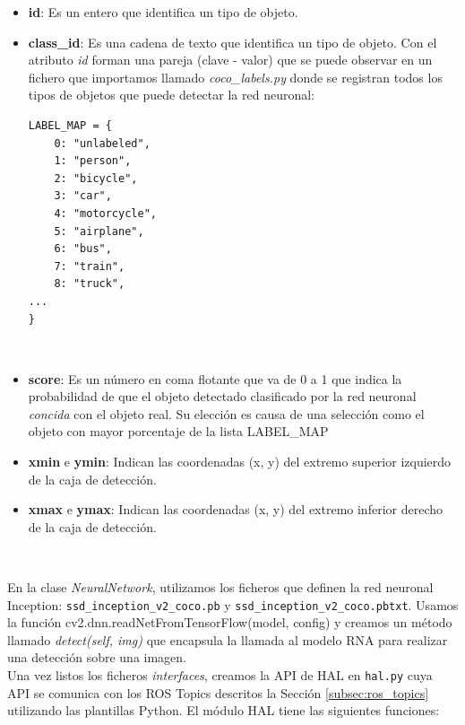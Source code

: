 \begin{itemize}
	\item \textbf{id}: Es un entero que identifica un tipo de objeto.
	\item \textbf{class\_id}: Es una cadena de texto que identifica un tipo de objeto. Con el atributo \textit{id} forman una pareja (clave - valor) que se puede observar en un fichero que importamos llamado \textit{coco\_labels.py} donde se registran todos los tipos de objetos que puede detectar la red neuronal:\\
\begin{lstlisting}
LABEL_MAP = {
    0: "unlabeled",
    1: "person",
    2: "bicycle",
    3: "car",
    4: "motorcycle",
    5: "airplane",
    6: "bus",
    7: "train",
    8: "truck",
...
}
\end{lstlisting}\
	\item \textbf{score}: Es un número en coma flotante que va de 0 a 1 que indica la probabilidad de que el objeto detectado clasificado por la red neuronal \textit{concida} con el objeto real. Su elección es causa de una selección como el objeto con mayor porcentaje de la lista LABEL\_MAP
	\item \textbf{xmin} e \textbf{ymin}: Indican las coordenadas (x, y) del extremo superior izquierdo de la caja de detección.
	\item \textbf{xmax} e \textbf{ymax}: Indican las coordenadas (x, y) del extremo inferior derecho de la caja de detección.
\end{itemize}\

En la clase \textit{NeuralNetwork}, utilizamos los ficheros que definen la red neuronal Inception: \texttt{ssd\_inception\_v2\_coco.pb} y \texttt{ssd\_inception\_v2\_coco.pbtxt}. Usamos la función cv2.dnn.readNetFromTensorFlow(model, config) y creamos un método llamado \textit{detect(self, img)} que encapsula la llamada al modelo RNA para realizar una detección sobre una imagen.\\

Una vez listos los ficheros \textit{interfaces}, creamos la API de HAL en \texttt{hal.py} cuya API se comunica con los ROS Topics descritos la Sección \ref{subsec:ros_topics} utilizando las plantillas Python. El módulo HAL tiene las siguientes funciones:\\

